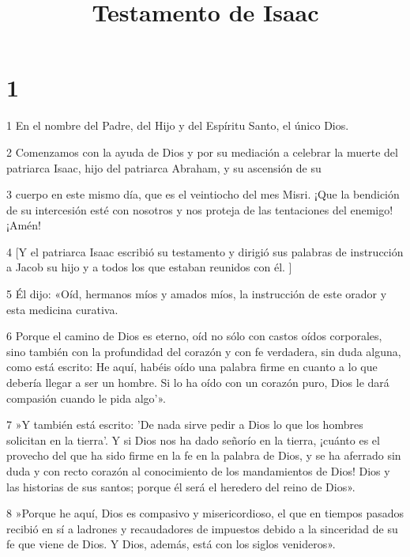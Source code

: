 


\title{Testamento de Isaac}

\chapter{1}

\par 1 En el nombre del Padre, del Hijo y del Espíritu Santo, el único Dios.

\par 2 Comenzamos con la ayuda de Dios y por su mediación a celebrar la muerte del patriarca Isaac, hijo del patriarca Abraham, y su ascensión de su

\par 3 cuerpo en este mismo día, que es el veintiocho del mes Misri. ¡Que la bendición de su intercesión esté con nosotros y nos proteja de las tentaciones del enemigo! ¡Amén!

\par 4 [Y el patriarca Isaac escribió su testamento y dirigió sus palabras de instrucción a Jacob su hijo y a todos los que estaban reunidos con él. ]

\par 5 Él dijo: «Oíd, hermanos míos y amados míos, la instrucción de este orador y esta medicina curativa.

\par 6 Porque el camino de Dios es eterno, oíd no sólo con castos oídos corporales, sino también con la profundidad del corazón y con fe verdadera, sin duda alguna, como está escrito: He aquí, habéis oído una palabra firme en cuanto a lo que debería llegar a ser un hombre. Si lo ha oído con un corazón puro, Dios le dará compasión cuando le pida algo'».

\par 7 »Y también está escrito: 'De nada sirve pedir a Dios lo que los hombres solicitan en la tierra'. Y si Dios nos ha dado señorío en la tierra, ¡cuánto es el provecho del que ha sido firme en la fe en la palabra de Dios, y se ha aferrado sin duda y con recto corazón al conocimiento de los mandamientos de Dios! Dios y las historias de sus santos; porque él será el heredero del reino de Dios».

\par 8 »Porque he aquí, Dios es compasivo y misericordioso, el que en tiempos pasados ​​recibió en sí a ladrones y recaudadores de impuestos debido a la sinceridad de su fe que viene de Dios. Y Dios, además, está con los siglos venideros».

